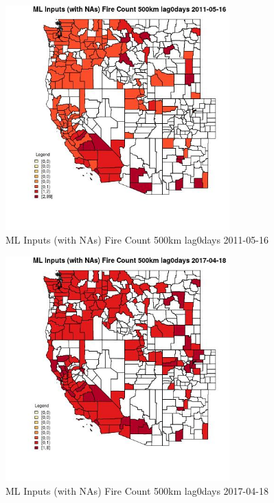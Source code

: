 \begin{figure} 
\centering  
\includegraphics[width=0.77\textwidth]{Code_Outputs/Report_ML_input_PM25_Step4_part_e_de_duplicated_aves_compiled_2019-05-20wNAs_CountyFire_Count_500km_lag0daysMean2011-05-16.jpg} 
\caption{\label{fig:Report_ML_input_PM25_Step4_part_e_de_duplicated_aves_compiled_2019-05-20wNAsCountyFire_Count_500km_lag0daysMean2011-05-16}ML Inputs (with NAs) Fire Count 500km lag0days 2011-05-16} 
\end{figure} 
 

\begin{figure} 
\centering  
\includegraphics[width=0.77\textwidth]{Code_Outputs/Report_ML_input_PM25_Step4_part_e_de_duplicated_aves_compiled_2019-05-20wNAs_CountyFire_Count_500km_lag0daysMean2017-04-18.jpg} 
\caption{\label{fig:Report_ML_input_PM25_Step4_part_e_de_duplicated_aves_compiled_2019-05-20wNAsCountyFire_Count_500km_lag0daysMean2017-04-18}ML Inputs (with NAs) Fire Count 500km lag0days 2017-04-18} 
\end{figure} 
 

